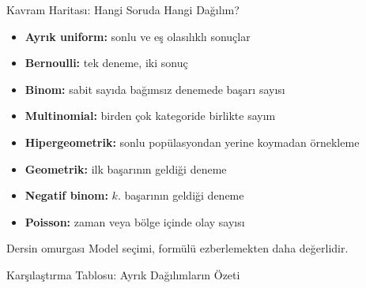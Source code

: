\documentclass[light]{lutbeamer}
\begin{document}
\begin{frame}{Kavram Haritası: Hangi Soruda Hangi Dağılım?}
    \small
    \begin{itemize}
        \item \textbf{Ayrık uniform:} sonlu ve eş olasılıklı sonuçlar
        \item \textbf{Bernoulli:} tek deneme, iki sonuç
        \item \textbf{Binom:} sabit sayıda bağımsız denemede başarı sayısı
        \item \textbf{Multinomial:} birden çok kategoride birlikte sayım
        \item \textbf{Hipergeometrik:} sonlu popülasyondan yerine koymadan örnekleme
        \item \textbf{Geometrik:} ilk başarının geldiği deneme
        \item \textbf{Negatif binom:} \(k\). başarının geldiği deneme
        \item \textbf{Poisson:} zaman veya bölge içinde olay sayısı
    \end{itemize}

    \begin{alertblock}{Dersin omurgası}
        Model seçimi, formülü ezberlemekten daha değerlidir.
    \end{alertblock}
\end{frame}

\begin{frame}{Karşılaştırma Tablosu: Ayrık Dağılımların Özeti}
    \scriptsize
    \begin{center}
    \end{center}
\end{frame}
\end{document}
